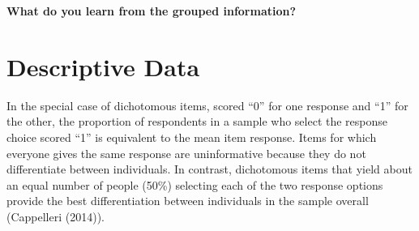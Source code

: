 \documentclass[
  letterpaper,
  DIV=11,
  numbers=noendperiod]{scrreprt}
\begin{document}
\textbf{What do you learn from the grouped information?}

\hypertarget{descriptive-data}{%
\chapter{Descriptive Data}\label{descriptive-data}}

In the special case of dichotomous items, scored ``0'' for one response
and ``1'' for the other, the proportion of respondents in a sample who
select the response choice scored ``1'' is equivalent to the mean item
response. Items for which everyone gives the same response are
uninformative because they do not differentiate between individuals. In
contrast, dichotomous items that yield about an equal number of people
(50\%) selecting each of the two response options provide the best
differentiation between individuals in the sample overall (Cappelleri
(2014)).
\end{document}

